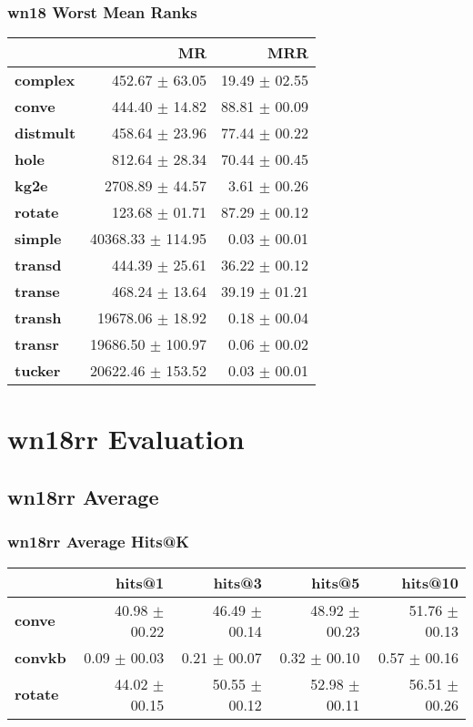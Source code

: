 \documentclass{article}
\begin{document}
\subsubsection{wn18 Worst Mean Ranks}
    \begin{center}
    \begin{tabular}{lrr}
\toprule
{} &                 MR &            MRR \\
\midrule
\textbf{complex } &     452.67 $\pm$ 63.05 &  19.49 $\pm$ 02.55 \\
\textbf{conve   } &     444.40 $\pm$ 14.82 &  88.81 $\pm$ 00.09 \\
\textbf{distmult} &     458.64 $\pm$ 23.96 &  77.44 $\pm$ 00.22 \\
\textbf{hole    } &     812.64 $\pm$ 28.34 &  70.44 $\pm$ 00.45 \\
\textbf{kg2e    } &    2708.89 $\pm$ 44.57 &   3.61 $\pm$ 00.26 \\
\textbf{rotate  } &     123.68 $\pm$ 01.71 &  87.29 $\pm$ 00.12 \\
\textbf{simple  } &  40368.33 $\pm$ 114.95 &   0.03 $\pm$ 00.01 \\
\textbf{transd  } &     444.39 $\pm$ 25.61 &  36.22 $\pm$ 00.12 \\
\textbf{transe  } &     468.24 $\pm$ 13.64 &  39.19 $\pm$ 01.21 \\
\textbf{transh  } &   19678.06 $\pm$ 18.92 &   0.18 $\pm$ 00.04 \\
\textbf{transr  } &  19686.50 $\pm$ 100.97 &   0.06 $\pm$ 00.02 \\
\textbf{tucker  } &  20622.46 $\pm$ 153.52 &   0.03 $\pm$ 00.01 \\
\bottomrule
\end{tabular}

    \end{center}

\section{wn18rr Evaluation}
\subsection{wn18rr Average}
\subsubsection{wn18rr Average Hits@K}
    \begin{center}
    \begin{tabular}{lrrrr}
\toprule
{} &         hits@1 &         hits@3 &         hits@5 &        hits@10 \\
\midrule
\textbf{conve } &  40.98 $\pm$ 00.22 &  46.49 $\pm$ 00.14 &  48.92 $\pm$ 00.23 &  51.76 $\pm$ 00.13 \\
\textbf{convkb} &   0.09 $\pm$ 00.03 &   0.21 $\pm$ 00.07 &   0.32 $\pm$ 00.10 &   0.57 $\pm$ 00.16 \\
\textbf{rotate} &  44.02 $\pm$ 00.15 &  50.55 $\pm$ 00.12 &  52.98 $\pm$ 00.11 &  56.51 $\pm$ 00.26 \\
\bottomrule
\end{tabular}

    \end{center}
\end{document}
